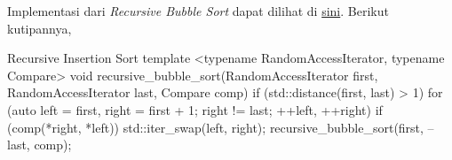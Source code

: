 \TheSolution Implementasi dari \textit{Recursive Bubble Sort} dapat dilihat di \href{https://github.com/okka-riswana/AnalgoKu/blob/8db63a0d830d90c0f0fba2e2cc53272ffe58b6e7/src/analgoku4/sorting.hpp#L118}{sini}. Berikut kutipannya,

\begin{code}[cpp]{Recursive Insertion Sort}
template <typename RandomAccessIterator, typename Compare>
void recursive_bubble_sort(RandomAccessIterator first,
                           RandomAccessIterator last,
                           Compare comp) {
  if (std::distance(first, last) > 1) {
    for (auto left = first, right = first + 1; right != last;
         ++left, ++right) {
      if (comp(*right, *left)) {
        std::iter_swap(left, right);
      }
    }
    recursive_bubble_sort(first, --last, comp);
  }
}
\end{code}